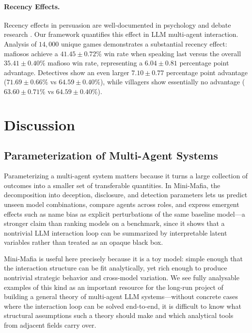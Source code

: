 \documentclass[sigconf]{aamas}
\begin{document}
\paragraph{Recency Effects.}

Recency effects in persuasion are well-documented in psychology and debate research \citep{miller1964}. Our framework quantifies this effect in LLM multi-agent interaction. Analysis of $14,000$ unique games demonstrates a substantial recency effect: mafiosos achieve a $41.45 \pm 0.72\%$ win rate when speaking last versus the overall $35.41 \pm 0.40\%$ mafioso win rate, representing a $6.04 \pm 0.81$ percentage point advantage. Detectives show an even larger $7.10 \pm 0.77$ percentage point advantage ($71.69 \pm 0.66\%$ vs $64.59 \pm 0.40\%$), while villagers show essentially no advantage ($63.60 \pm 0.71\%$ vs $64.59 \pm 0.40\%$).


\section{Discussion}
\label{sec:discussion}

\subsection{Parameterization of Multi-Agent Systems}

Parameterizing a multi-agent system matters because it turns a large collection of outcomes into a smaller set of transferable quantities. In Mini-Mafia, the decomposition into deception, disclosure, and detection parameters lets us predict unseen model combinations, compare agents across roles, and express emergent effects such as name bias as explicit perturbations of the same baseline model---a stronger claim than ranking models on a benchmark, since it shows that a nontrivial LLM interaction loop can be summarized by interpretable latent variables rather than treated as an opaque black box.

Mini-Mafia is useful here precisely because it is a toy model: simple enough that the interaction structure can be fit analytically, yet rich enough to produce nontrivial strategic behavior and cross-model variation. We see fully analysable examples of this kind as an important resource for the long-run project of building a general theory of multi-agent LLM systems---without concrete cases where the interaction loop can be solved end-to-end, it is difficult to know what structural assumptions such a theory should make and which analytical tools from adjacent fields carry over.
\end{document}
